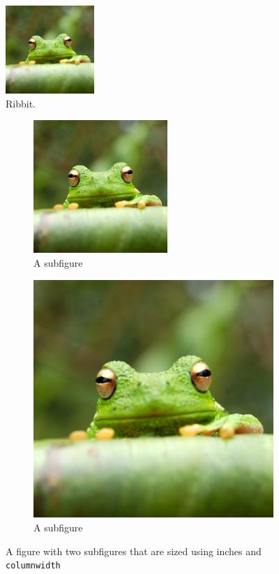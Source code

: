 \begin{figure}[h] 
	\centering
	\includegraphics[width=0.3\textwidth]{frog.jpg} %
	\caption{Ribbit.}
	\label{fig:frog}
\end{figure}

\begin{figure}[h!]
\centering
\begin{subfigure}{.5\columnwidth}
  \centering
  \includegraphics[width=2in]{frog.jpg} 
  \caption{A subfigure}
  \label{fig:sub1}
\end{subfigure}%
\begin{subfigure}{.5\columnwidth}
  \centering
  \includegraphics[width=.45\columnwidth]{frog.jpg}
  \caption{A subfigure}
  \label{fig:sub2}
\end{subfigure}
\caption{A figure with two subfigures that are sized using inches and \texttt{columnwidth}}
\label{fig:sidebyside}
\end{figure}


